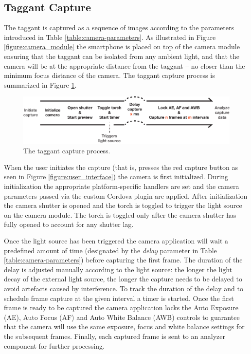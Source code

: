 \documentclass[thesis.tex]{subfiles}
\begin{document}
\subsection{Taggant Capture}

The taggant is captured as a sequence of images according to the parameters introduced in Table \ref{table:camera-parameters}. As illustrated in Figure \ref{figure:camera_module} the smartphone is placed on top of the camera module ensuring that the taggant can be isolated from any ambient light, and that the camera will be at the appropriate distance from the taggant -- no closer than the minimum focus distance of the camera. The taggant capture process is summarized in Figure \ref{figure:taggant-capture-process}.

\begin{figure}[h]
\centering \includegraphics[width=\textwidth,height=\textheight,keepaspectratio=true]{images/design_implementation/capture_process.pdf}
\caption{The taggant capture process. \label{figure:taggant-capture-process}}
\end{figure}

When the user initiates the capture (that is, presses the red capture button as seen in Figure \ref{figure:user_interface}) the camera is first initialized. During initialization the appropriate platform-specific handlers are set and the camera parameters passed via the custom Cordova plugin are applied. After initialization the camera shutter is opened and the torch is toggled to trigger the light source on the camera module. The torch is toggled only after the camera shutter has fully opened to account for any shutter lag.

Once the light source has been triggered the camera application will wait a predefined amount of time (designated by the \emph{delay} parameter in Table \ref{table:camera-parameters}) before capturing the first frame. The duration of the delay is adjusted manually according to the light source: the longer the light decay of the external light source, the longer the capture needs to be delayed to avoid artefacts caused by interference. To track the duration of the delay and to schedule frame capture at the given interval a timer is started. Once the first frame is ready to be captured the camera application locks the Auto Exposure (AE), Auto Focus (AF) and Auto White Balance (AWB) controls to guarantee that the camera will use the same exposure, focus and white balance settings for the subsequent frames. Finally, each captured frame is sent to an analyzer component for further processing.
\end{document}
